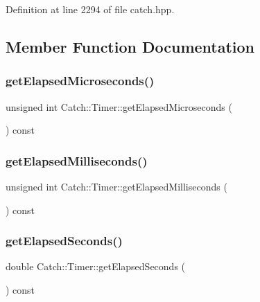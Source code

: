 Definition at line 2294 of file catch.\+hpp.



\subsection{Member Function Documentation}
\hypertarget{class_catch_1_1_timer_af592ca4a9d340b9855732e4af777eaf0}{}\label{class_catch_1_1_timer_af592ca4a9d340b9855732e4af777eaf0} 
\subsubsection{\texorpdfstring{get\+Elapsed\+Microseconds()}{getElapsedMicroseconds()}}
{\footnotesize\ttfamily unsigned int Catch\+::\+Timer\+::get\+Elapsed\+Microseconds (\begin{DoxyParamCaption}{ }\end{DoxyParamCaption}) const}

\hypertarget{class_catch_1_1_timer_a2081b2d36950ab6912e7c4958afe0099}{}\label{class_catch_1_1_timer_a2081b2d36950ab6912e7c4958afe0099} 
\subsubsection{\texorpdfstring{get\+Elapsed\+Milliseconds()}{getElapsedMilliseconds()}}
{\footnotesize\ttfamily unsigned int Catch\+::\+Timer\+::get\+Elapsed\+Milliseconds (\begin{DoxyParamCaption}{ }\end{DoxyParamCaption}) const}

\hypertarget{class_catch_1_1_timer_ae1615c8a9aa44b7a96cfe8a35d34e5de}{}\label{class_catch_1_1_timer_ae1615c8a9aa44b7a96cfe8a35d34e5de} 
\subsubsection{\texorpdfstring{get\+Elapsed\+Seconds()}{getElapsedSeconds()}}
{\footnotesize\ttfamily double Catch\+::\+Timer\+::get\+Elapsed\+Seconds (\begin{DoxyParamCaption}{ }\end{DoxyParamCaption}) const}

